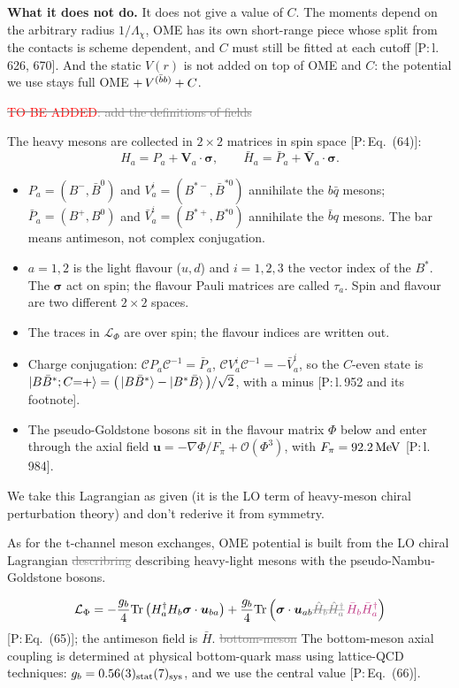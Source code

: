 \documentclass[11pt]{article}
\newcommand{\todo}{\textcolor{red}{TO BE ADDED}}
\newcommand{\tagP}[1]{\textcolor{blue!65!black}{\textsf{\small[P:\,#1]}}}
\newcommand{\ai}[1]{\textcolor{aicolor}{#1}}
\newcommand{\aifix}[2]{\textcolor{gray}{\sout{#1}} \textcolor{aicolor}{#2}}
\newcommand{\aifixm}[2]{\textcolor{gray}{\text{\sout{$#1$}}}\,\textcolor{aicolor}{#2}}
\newcommand{\ai}[1]{#1}
\newcommand{\aifix}[2]{#2}
\newcommand{\aifixm}[2]{#2}
\newenvironment{aiadd}{\par}{\par}
\begin{document}
\begin{aiadd}
	\textbf{What it does not do.} It does not give a value of $C$. The moments depend on the arbitrary radius $1/\Lambda_\chi$, OME has its own short-range piece whose split from the contacts is scheme dependent, and $C$ must still be fitted at each cutoff \tagP{l.\,626, 670}. And the static $V(r)$ is not added on top of OME and $C$: the potential we use stays full OME $+\,V^{(\bar{b}b)}+C$.
\end{aiadd}

\aifix{\todo: add the definitions of fields}{}

\begin{aiadd}
	The heavy mesons are collected in $2\times2$ matrices in spin space \tagP{Eq.~(64)}:
	\[
		H_a=P_a+\bm V_a\cdot\bm\sigma,\qquad \bar H_a=\bar P_a+\bar{\bm V}_a\cdot\bm\sigma .
	\]
	\begin{itemize}
		\item $P_a=(B^-,\bar B^0)$ and $V^i_a=(B^{*-},\bar B^{*0})$ annihilate the $b\bar q$ mesons; $\bar P_a=(B^+,B^0)$ and $\bar V^i_a=(B^{*+},B^{*0})$ annihilate the $\bar bq$ mesons. The bar means antimeson, not complex conjugation.
		\item $a=1,2$ is the light flavour ($u,d$) and $i=1,2,3$ the vector index of the $B^*$. The $\bm\sigma$ act on spin; the flavour Pauli matrices are called $\tau_a$. Spin and flavour are two different $2\times2$ spaces.
		\item The traces in $\mathcal L_\Phi$ are over spin; the flavour indices are written out.
		\item Charge conjugation: $\mathcal CP_a\mathcal C^{-1}=\bar P_a$, $\mathcal CV^i_a\mathcal C^{-1}=-\bar V^i_a$, so the $C$-even state is $\ket{B\bar B^*;C{=}+}=\big(\ket{B\bar B^*}-\ket{B^*\bar B}\big)/\sqrt2$, with a minus \tagP{l.\,952 and its footnote}.
		\item The pseudo-Goldstone bosons sit in the flavour matrix $\Phi$ below and enter through the axial field $\bm u=-\nabla\Phi/F_\pi+\mathcal O(\Phi^3)$, with $F_\pi=92.2\,\mathrm{MeV}$ \tagP{l.\,984}.
	\end{itemize}
	We take this Lagrangian as given (it is the LO term of heavy-meson chiral perturbation theory) and don't rederive it from symmetry.
\end{aiadd}

As for the t-channel meson exchanges, OME potential is built from the LO chiral Lagrangian \aifix{describring}{describing} heavy-light mesons with the pseudo-Nambu-Goldstone bosons.

\[
	\mathcal{L}_{\Phi} = -\frac{g_b}{4}\mathrm{Tr}\left(H_a^\dagger H_b \bm{\sigma}\cdot \bm{u}_{ba}\right) + \frac{g_b}{4}\mathrm{Tr}\left(\bm{\sigma}\cdot\bm{u}_{ab}\aifixm{\hat H_b \hat H_a^\dagger}{\bar H_b\bar H_a^\dagger}\right)
\]
\ai{\tagP{Eq.~(65)}; the antimeson field is $\bar H$.} \aifix{bottom-meson}{The bottom-meson} axial coupling is determined at physical bottom-quark mass using lattice-QCD techniques\ai{: $g_b=0.56(3)_{\rm stat}(7)_{\rm sys}$, and we use the central value \tagP{Eq.~(66)}}.
\end{document}
